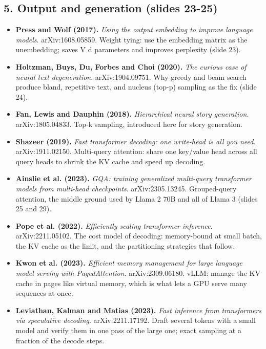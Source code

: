 \documentclass[11pt,letterpaper]{article}
\begin{document}
\subsection*{5. Output and generation (slides 23-25)}
\begin{itemize}[leftmargin=1.2em,itemsep=3pt]\sloppy
\item \textbf{Press and Wolf (2017).} \textit{Using the output embedding to improve language models}. arXiv:1608.05859. Weight tying: use the embedding matrix as the unembedding; saves V d parameters and improves perplexity (slide 23).
\item \textbf{Holtzman, Buys, Du, Forbes and Choi (2020).} \textit{The curious case of neural text degeneration}. arXiv:1904.09751. Why greedy and beam search produce bland, repetitive text, and nucleus (top-p) sampling as the fix (slide 24).
\item \textbf{Fan, Lewis and Dauphin (2018).} \textit{Hierarchical neural story generation}. arXiv:1805.04833. Top-k sampling, introduced here for story generation.
\item \textbf{Shazeer (2019).} \textit{Fast transformer decoding: one write-head is all you need}. arXiv:1911.02150. Multi-query attention: share one key/value head across all query heads to shrink the KV cache and speed up decoding.
\item \textbf{Ainslie et al. (2023).} \textit{GQA: training generalized multi-query transformer models from multi-head checkpoints}. arXiv:2305.13245. Grouped-query attention, the middle ground used by Llama 2 70B and all of Llama 3 (slides 25 and 29).
\item \textbf{Pope et al. (2022).} \textit{Efficiently scaling transformer inference}. arXiv:2211.05102. The cost model of decoding: memory-bound at small batch, the KV cache as the limit, and the partitioning strategies that follow.
\item \textbf{Kwon et al. (2023).} \textit{Efficient memory management for large language model serving with PagedAttention}. arXiv:2309.06180. vLLM: manage the KV cache in pages like virtual memory, which is what lets a GPU serve many sequences at once.
\item \textbf{Leviathan, Kalman and Matias (2023).} \textit{Fast inference from transformers via speculative decoding}. arXiv:2211.17192. Draft several tokens with a small model and verify them in one pass of the large one; exact sampling at a fraction of the decode steps.
\end{itemize}
\end{document}
